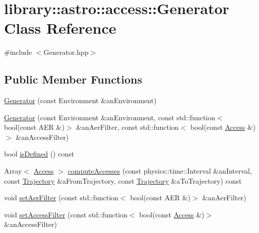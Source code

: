 \hypertarget{classlibrary_1_1astro_1_1access_1_1_generator}{}\section{library\+:\+:astro\+:\+:access\+:\+:Generator Class Reference}
\label{classlibrary_1_1astro_1_1access_1_1_generator}


{\ttfamily \#include $<$Generator.\+hpp$>$}

\subsection*{Public Member Functions}
\begin{DoxyCompactItemize}
\item 
\hyperlink{classlibrary_1_1astro_1_1access_1_1_generator_a7b07719b1622bb4ffb7fe0d654f91fea}{Generator} (const Environment \&an\+Environment)
\item 
\hyperlink{classlibrary_1_1astro_1_1access_1_1_generator_a8a555bd3bd79329602026814955077f7}{Generator} (const Environment \&an\+Environment, const std\+::function$<$ bool(const A\+ER \&)$>$ \&an\+Aer\+Filter, const std\+::function$<$ bool(const \hyperlink{classlibrary_1_1astro_1_1_access}{Access} \&)$>$ \&an\+Access\+Filter)
\item 
bool \hyperlink{classlibrary_1_1astro_1_1access_1_1_generator_aa7d19995a53368779ed55c254bb9b64f}{is\+Defined} () const
\item 
Array$<$ \hyperlink{classlibrary_1_1astro_1_1_access}{Access} $>$ \hyperlink{classlibrary_1_1astro_1_1access_1_1_generator_ab6e35507090c7ce4367266f2d76c9178}{compute\+Accesses} (const physics\+::time\+::\+Interval \&an\+Interval, const \hyperlink{classlibrary_1_1astro_1_1_trajectory}{Trajectory} \&a\+From\+Trajectory, const \hyperlink{classlibrary_1_1astro_1_1_trajectory}{Trajectory} \&a\+To\+Trajectory) const
\item 
void \hyperlink{classlibrary_1_1astro_1_1access_1_1_generator_a2676ec52653573cf1ff91876f671a679}{set\+Aer\+Filter} (const std\+::function$<$ bool(const A\+ER \&)$>$ \&an\+Aer\+Filter)
\item 
void \hyperlink{classlibrary_1_1astro_1_1access_1_1_generator_a74992fd0314e87ffd4b47a2c7f20c646}{set\+Access\+Filter} (const std\+::function$<$ bool(const \hyperlink{classlibrary_1_1astro_1_1_access}{Access} \&)$>$ \&an\+Access\+Filter)
\end{DoxyCompactItemize}

